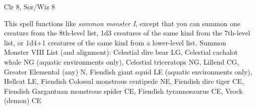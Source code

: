 
\begin{description*}
\item[Level:] Clr 8, Sor/Wiz 8
\end{description*}

This spell functions like \textit{summon monster I}, except that you can summon
one creature from the 8th-level list, 1d3 creatures of the same kind from the 7th-level
list, or 1d4+1 creatures of the same kind from a lower-level list.
Summon Monster VIII List (and alignment): Celestial dire bear LG, Celestial cachalot whale NG (aquatic environments only), Celestial triceratops NG, Lillend CG, Greater Elemental (any) N, Fiendish giant squid LE (aquatic environments only), Hellcat LE, Fiendish Colossal monstrous centipede NE, Fiendish dire tiger CE, Fiendish Gargantuan monstrous spider CE, Fiendish tyrannosaurus CE, Vrock (demon) CE